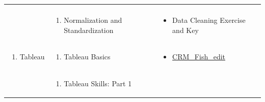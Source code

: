 \documentclass[
]{book}
\providecommand{\tightlist}{%
  \setlength{\itemsep}{0pt}\setlength{\parskip}{0pt}}
\begin{document}
\begin{longtable}[]{@{}lll@{}}
\begin{minipage}[t]{0.42\columnwidth}
\end{minipage}\tabularnewline
\begin{minipage}[t]{0.15\columnwidth}\raggedright
\strut
\end{minipage} & \begin{minipage}[t]{0.34\columnwidth}\raggedright
\begin{enumerate}
\def\labelenumi{\arabic{enumi}.}
\setcounter{enumi}{2}
\tightlist
\item
  Normalization and Standardization
\end{enumerate}\strut
\end{minipage} & \begin{minipage}[t]{0.42\columnwidth}\raggedright
\begin{itemize}
\tightlist
\item
  Data Cleaning Exercise and Key
\end{itemize}\strut
\end{minipage}\tabularnewline
\begin{minipage}[t]{0.15\columnwidth}\raggedright
\begin{enumerate}
\def\labelenumi{\arabic{enumi}.}
\setcounter{enumi}{2}
\tightlist
\item
  Tableau
\end{enumerate}\strut
\end{minipage} & \begin{minipage}[t]{0.34\columnwidth}\raggedright
\begin{enumerate}
\def\labelenumi{\arabic{enumi}.}
\tightlist
\item
  Tableau Basics
\end{enumerate}\strut
\end{minipage} & \begin{minipage}[t]{0.42\columnwidth}\raggedright
\begin{itemize}
\tightlist
\item
  \href{files/CRM_Fish_edit.xlsx}{CRM\_Fish\_edit}
\end{itemize}\strut
\end{minipage}\tabularnewline
\begin{minipage}[t]{0.15\columnwidth}\raggedright
\strut
\end{minipage} & \begin{minipage}[t]{0.34\columnwidth}\raggedright
\begin{enumerate}
\def\labelenumi{\arabic{enumi}.}
\setcounter{enumi}{1}
\tightlist
\item
  Tableau Skills: Part 1
\end{enumerate}\strut

\end{minipage}
\end{longtable}
\end{document}
